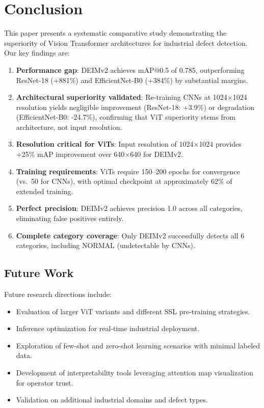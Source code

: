 \documentclass[journal,twoside,web]{ieeecolor}
\begin{document}
\section{Conclusion}
\label{sec:conclusion}

This paper presents a systematic comparative study demonstrating the superiority of Vision Transformer architectures for industrial defect detection. Our key findings are:

\begin{enumerate}
    \item \textbf{Performance gap}: DEIMv2 achieves mAP@0.5 of 0.785, outperforming ResNet-18 (+881\%) and EfficientNet-B0 (+384\%) by substantial margins.
    
    \item \textbf{Architectural superiority validated}: Re-training CNNs at 1024$\times$1024 resolution yields negligible improvement (ResNet-18: +3.9\%) or degradation (EfficientNet-B0: -24.7\%), confirming that ViT superiority stems from architecture, not input resolution.
    
    \item \textbf{Resolution critical for ViTs}: Input resolution of 1024$\times$1024 provides +25\% mAP improvement over 640$\times$640 for DEIMv2.
    
    \item \textbf{Training requirements}: ViTs require 150--200 epochs for convergence (vs.\ 50 for CNNs), with optimal checkpoint at approximately 62\% of extended training.
    
    \item \textbf{Perfect precision}: DEIMv2 achieves precision 1.0 across all categories, eliminating false positives entirely.
    
    \item \textbf{Complete category coverage}: Only DEIMv2 successfully detects all 6 categories, including NORMAL (undetectable by CNNs).
\end{enumerate}

\subsection{Future Work}

Future research directions include:

\begin{itemize}
    \item Evaluation of larger ViT variants and different SSL pre-training strategies.
    \item Inference optimization for real-time industrial deployment.
    \item Exploration of few-shot and zero-shot learning scenarios with minimal labeled data.
    \item Development of interpretability tools leveraging attention map visualization for operator trust.
    \item Validation on additional industrial domains and defect types.
\end{itemize}
\end{document}
